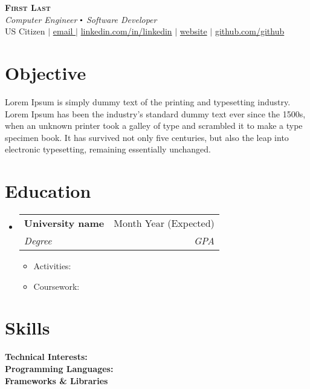 \documentclass[letterpaper,10pt]{article}
\makeatletter
\def\sectionSpacing{-14pt}
\newcommand{\educationItem}[1]{
  \item\footnotesize{
    {#1 \vspace{-2pt}}
  }
}
\newcommand{\educationHeading}[4]{
  \vspace{-2pt}\item
    \begin{tabular*}{0.97\textwidth}[t]{l@{\extracolsep{\fill}}r}
      \textbf{#1} & #2 \\
      \textit{\small#3} & \textit{\small #4} \\
    \end{tabular*}\vspace{-7pt}
}
\newcommand{\resumeSubHeadingListStart}{\begin{itemize}[leftmargin=0.15in, label={}]}
\newcommand{\resumeSubHeadingListEnd}{\end{itemize}}
\newcommand{\resumeItemListStart}{\begin{itemize}}
\newcommand{\resumeItemListEnd}{\end{itemize}\vspace{-5pt}}
\newcommand\sbullet[1][.5]{\mathbin{\vcenter{\hbox{\scalebox{#1}{$\bullet$}}}}}
\newcommand{\status}[1]{#1}
\newcommand{\phone}[1]{#1}
\newcommand{\mail}[1]{\href{mailto:#1}{#1}}
\newcommand{\linkedin}[1]{\href{https://www.linkedin.com/in/#1/}{linkedin.com/in/#1}}
\newcommand{\website}[1]{\href{https://#1}{#1}}
\newcommand{\github}[1]{\href{https://github.com/#1}{github.com/#1}}
\makeatother
\begin{document}

\begin{center}
    \textbf{\Huge \scshape First Last} \\ \vspace{4pt}
    \footnotesize{\textit{Computer Engineer $\sbullet[0.6]$ Software Developer}}\\ \vspace{4pt}
    \scriptsize
    {
    \status{US Citizen} $ | $ 
    \mail{ email }$ | $ 
    \linkedin{linkedin} $ | $
    \website{website} $ | $
    \github{github}
    }
\end{center}

\section{Objective}
\small{
Lorem Ipsum is simply dummy text of the printing and typesetting industry. Lorem Ipsum has been the industry's standard dummy text ever since the 1500s, when an unknown printer took a galley of type and scrambled it to make a type specimen book. It has survived not only five centuries, but also the leap into electronic typesetting, remaining essentially unchanged.
}

\vspace{-8pt}
\section{Education}
  \resumeSubHeadingListStart
    \educationHeading
      {\small University name}{\small Month Year (Expected)}
      {\footnotesize{Degree}}{\footnotesize{GPA}}
      {
        \resumeItemListStart[leftmargin=1em]
        \educationItem{Activities: }
        \educationItem {Coursework: }
        \resumeItemListEnd
      }
  \resumeSubHeadingListEnd
\vspace{\sectionSpacing}
\section{Skills}
 \begin{itemize}[leftmargin=0.15in, label={}]
    \footnotesize{\item{

     \textbf{Technical Interests:}{}\\
     \textbf{Programming Languages:}{}\\
     \textbf{Frameworks \& Libraries}{}\\
    }} 
 \end{itemize}
 
\end{document}
